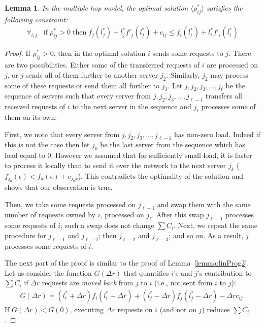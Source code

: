 \documentclass[11pt]{article}
\newtheorem{lemma}[theorem]{Lemma}
\begin{document}
\begin{lemma}\label{lemma:linProg3}
In the multiple hop model, the optimal solution $\langle \rho_{ij}^{*} \rangle$ satisfies the following constraint:
\begin{align}
\forall_{i, j} \; \; \; \text{if} \; \rho^{*}_{ij} > 0 \; \text{then} \; f_{j}(l^{*}_j) + l^{*}_jf'_{j}(l^{*}_j) + c_{ij} \leq f_{i}(l^{*}_i) + l^{*}_if'_{i}(l^{*}_i) \label{in:linProgram4}
\end{align}
\end{lemma}
\begin{proof}
If $\rho^{*}_{ij} > 0$, then in the optimal solution $i$ sends some requests to $j$. There are two possibilities. Either some of the transferred requests of $i$ are processed on $j$, or $j$ sends all of them further to another server $j_2$. Similarly, $j_2$ may process some of these requests or send them all further to $j_3$. Let $j, j_2, j_3, \dots, j_{\ell}$ be the sequence of servers such that every server from $j, j_2, j_3, \dots, j_{\ell-1}$ transfers all received requests of $i$ to the next server in the sequence and $j_{\ell}$ processes some of them on its own.

First, we note that every server from $j, j_2, j_3, \dots, j_{\ell-1}$ has non-zero load. Indeed if this is not the case then let $j_{0}$ be the last server from the sequence which has load equal to 0. However we assumed that for sufficiently small load, it is faster to process it locally than to send it over the network to the next server $j_{k}$ ($f_{j_{0}}(\epsilon) < f_{k}(\epsilon) + c_{j_{0}k}$). This contradicts the optimality of the solution and shows that our observation is true.

Then, we take some requests processed on $j_{\ell-1}$ and swap them with the same number of requests owned by $i$, processed on $j_{\ell}$. After this swap $j_{\ell-1}$ processes some requests of $i$; such a swap does not change $\sum{C_i}$. Next, we repeat the same procedure for $j_{\ell-1}$ and $j_{\ell-2}$; then $j_{\ell-2}$ and $j_{\ell - 3}$; and so on. As a result, $j$ processes some requests of $i$.

The next part of the proof is similar to the proof of Lemma~\ref{lemma:linProg2}. Let us consider the function $G(\Delta r)$ that quantifies $i$'s and $j$'s contribution to $\sum{C_i}$ if $\Delta r$ requests are \emph{moved back} from $j$ to $i$ (i.e., not sent from $i$ to $j$):
\begin{align*}
G(\Delta r) = (l^{*}_i + \Delta r)f_{i}(l^{*}_i + \Delta r) + (l^{*}_j - \Delta r)f_{j}(l^{*}_j - \Delta r) - \Delta r c_{ij} \text{.}
\end{align*}
If $G(\Delta r) < G(0)$, executing $\Delta r$ requests on $i$ (and not on $j$) reduces $\sum{C_i}$.


\end{proof}
\end{document}
